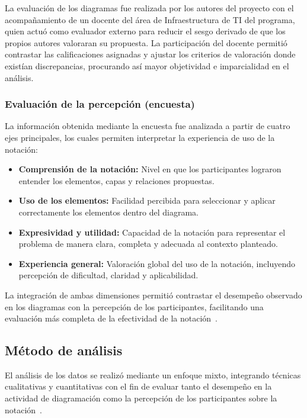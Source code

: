 \noindent
La evaluación de los diagramas fue realizada por los autores del proyecto con el acompañamiento de un docente del área de Infraestructura de TI del programa, quien actuó como evaluador externo para reducir el sesgo derivado de que los propios autores valoraran su propuesta. La participación del docente permitió contrastar las calificaciones asignadas y ajustar los criterios de valoración donde existían discrepancias, procurando así mayor objetividad e imparcialidad en el análisis.

\subsubsection{Evaluación de la percepción (encuesta)}
\noindent
La información obtenida mediante la encuesta fue analizada a partir de cuatro ejes principales, los cuales permiten interpretar la experiencia de uso de la notación:

\begin{itemize}
\item \textbf{Comprensión de la notación:} Nivel en que los participantes lograron entender los elementos, capas y relaciones propuestas.

\item \textbf{Uso de los elementos:} Facilidad percibida para seleccionar y aplicar correctamente los elementos dentro del diagrama.

\item \textbf{Expresividad y utilidad:} Capacidad de la notación para representar el problema de manera clara, completa y adecuada al contexto planteado.

\item \textbf{Experiencia general:} Valoración global del uso de la notación, incluyendo percepción de dificultad, claridad y aplicabilidad.
\end{itemize}

\noindent
La integración de ambas dimensiones permitió contrastar el desempeño observado en los diagramas con la percepción de los participantes, facilitando una evaluación más completa de la efectividad de la notación~\NDITI.

\subsection{Método de análisis}
\noindent
El análisis de los datos se realizó mediante un enfoque mixto, integrando técnicas cualitativas y cuantitativas con el fin de evaluar tanto el desempeño en la actividad de diagramación como la percepción de los participantes sobre la notación~\NDITI.

